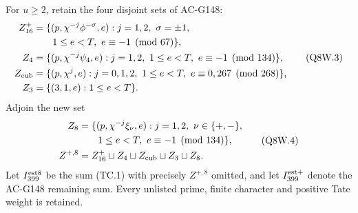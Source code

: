 For $u\geq2$, retain the four disjoint sets of AC-G148:
\[
 \begin{aligned}
 Z_{16}^+&=\{(p,\chi^{-j}\phi^{-\sigma},e):
      j=1,2,\ \sigma=\pm1,\\
 &\hspace{2em}1\leq e<T,\ e\equiv-1\pmod{67}\},\\
 Z_4&=\{(p,\chi^{-j}\psi_4,e):
      j=1,2,\ 1\leq e<T,\ e\equiv-1\pmod{134}\},\\
 Z_{\rm cub}&=\{(p,\chi^j,e):
      j=0,1,2,\ 1\leq e<T,\ e\equiv0,267\pmod{268}\},\\
 Z_3&=\{(3,1,e):1\leq e<T\}.
 \end{aligned}
 \tag{Q8W.3}
\]
Adjoin the new set
\[
 \begin{aligned}
 Z_8&=\{(p,\chi^{-j}\xi_\nu,e):j=1,2,\ \nu\in\{+,-\},\\
 &\hspace{2em}1\leq e<T,\ e\equiv-1\pmod{134}\},\\
 Z^{+,8}&=Z_{16}^+\sqcup Z_4\sqcup Z_{\rm cub}\sqcup Z_3\sqcup Z_8.
 \end{aligned}
 \tag{Q8W.4}
\]
Let $I_{399}^{\rm est8}$ be the sum (TC.1) with precisely
$Z^{+,8}$ omitted, and let $I_{399}^{\rm est+}$ denote the
AC-G148 remaining sum.  Every unlisted prime, finite character
and positive Tate weight is retained.

